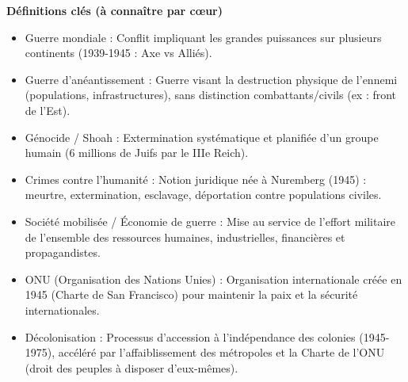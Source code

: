 \documentclass[11pt]{article}
\newcommand{\cle}[1]{{\popxbold\color{popdark}#1}}
\begin{document}
\begin{bilan}

\textbf{Définitions clés (à connaître par cœur)}
\begin{itemize}
    \item \cle{Guerre mondiale} : Conflit impliquant les grandes puissances sur plusieurs continents (1939-1945 : Axe vs Alliés).
    \item \cle{Guerre d'anéantissement} : Guerre visant la destruction physique de l'ennemi (populations, infrastructures), sans distinction combattants/civils (ex : front de l'Est).
    \item \cle{Génocide / Shoah} : Extermination systématique et planifiée d'un groupe humain (6 millions de Juifs par le IIIe Reich).
    \item \cle{Crimes contre l'humanité} : Notion juridique née à Nuremberg (1945) : meurtre, extermination, esclavage, déportation contre populations civiles.
    \item \cle{Société mobilisée / Économie de guerre} : Mise au service de l'effort militaire de l'ensemble des ressources humaines, industrielles, financières et propagandistes.
    \item \cle{ONU (Organisation des Nations Unies)} : Organisation internationale créée en 1945 (Charte de San Francisco) pour maintenir la paix et la sécurité internationales.
    \item \cle{Décolonisation} : Processus d'accession à l'indépendance des colonies (1945-1975), accéléré par l'affaiblissement des métropoles et la Charte de l'ONU (droit des peuples à disposer d'eux-mêmes).
\end{itemize}


\end{bilan}
\end{document}
